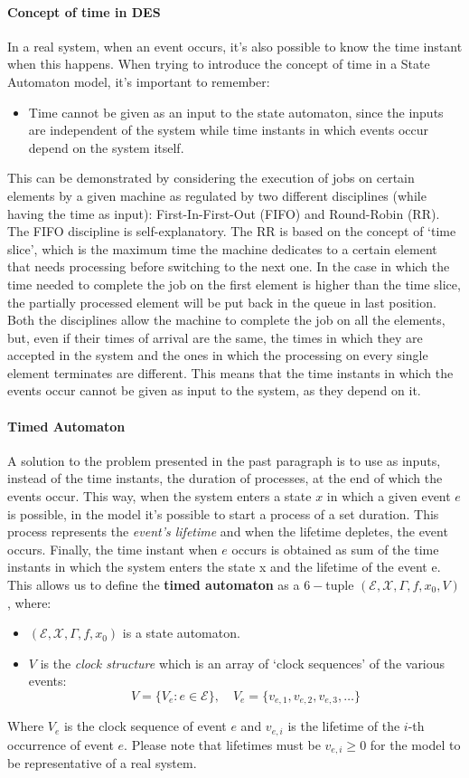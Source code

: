 \documentclass[12pt,a4paper]{article}
\begin{document}
\paragraph{Concept of time in DES} In a real system, when an event occurs, it’s also possible to know the time instant when this happens. When trying to introduce the concept of time in a State Automaton model, it’s important to remember:
\begin{itemize}
\item Time cannot be given as an input to the state automaton, since the inputs are independent of the system while time instants in which events occur depend on the system itself. 
\end{itemize}
This can be demonstrated by considering the execution of jobs on certain elements by a given machine as regulated by two different disciplines (while having the time as input): First-In-First-Out (FIFO) and Round-Robin (RR). The FIFO discipline is self-explanatory. The RR is based on the concept of `time slice’, which is the maximum time the machine dedicates to a certain element that needs processing before switching to the next one. In the case in which the time needed to complete the job on the first element is higher than the time slice, the partially processed element will be put back in the queue in last position.
Both the disciplines allow the machine to complete the job on all the elements, but, even if their times of arrival are the same, the times in which they are accepted in the system and the ones in which the processing on every single element terminates are different. This means that the time instants in which the events occur cannot be given as input to the system, as they depend on it.

\paragraph{Timed Automaton}
A solution to the problem presented in the past paragraph is to use as inputs, instead of the time instants, the duration of processes, at the end of which the events occur. This way, when the system enters a state $x$ in which a given event $e$ is possible, in the model it’s possible to start a process of a set duration. This process represents the \textit{event's lifetime} and when the lifetime depletes, the event occurs. Finally, the time instant when $e$ occurs is obtained as sum of the time instants in which the system enters the state x and the lifetime of the event e.
This allows us to define the \textbf{timed automaton} as a $6-$tuple $(\mathcal{E},\mathcal{X},\Gamma,f,x_0,V)$, where: 
\begin{itemize}
\item $(\mathcal{E},\mathcal{X},\Gamma,f,x_0)$ is a state automaton. 
\item $V$ is the \textit{clock structure} which is an array of `clock sequences’ of the various events:
$$
V=\{V_e : e\in\mathcal{E}\}, \quad V_e=\{v_{e,1}, v_{e,2}, v_{e,3},\dots\}
$$
\end{itemize}	
\noindent
Where $V_e$ is the clock sequence of event $e$ and $v_{e,i}$ is the lifetime of the $i$-th occurrence of event $e$. Please note that lifetimes must be $v_{e,i} \ge 0$ for the model to be representative of a real system.
\end{document}
